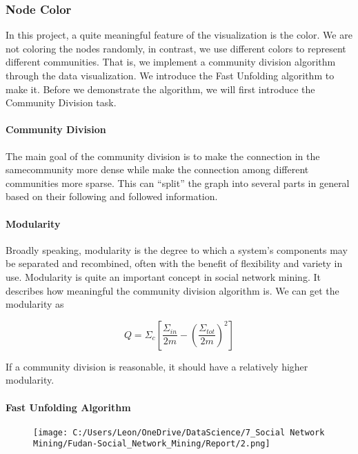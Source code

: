\documentclass[]{article}
\let\oldparagraph\paragraph
\renewcommand{\paragraph}[1]{\oldparagraph{#1}\mbox{}}
\begin{document}
\hypertarget{header-n16}{%
\subsubsection{Node Color}\label{header-n16}}

In this project, a quite meaningful feature of the visualization is the
color. We are not coloring the nodes randomly, in contrast, we use
different colors to represent different communities. That is, we
implement a community division algorithm through the data visualization.
We introduce the Fast Unfolding algorithm to make it. Before we
demonstrate the algorithm, we will first introduce the Community
Division task.

\hypertarget{header-n19}{%
\paragraph{Community Division}\label{header-n19}}

The main goal of the community division is to make the connection in the
samecommunity more dense while make the connection among different
communities more sparse. This can ``split'' the graph into several parts
in general based on their following and followed information.\\

\hypertarget{header-n22}{%
\paragraph{Modularity}\label{header-n22}}

Broadly speaking, modularity is the degree to which a system's
components may be separated and recombined, often with the benefit of
flexibility and variety in use. Modularity is quite an important concept
in social network mining. It describes how meaningful the community
division algorithm is. We can get the modularity as

\[Q =Σ_c  [ \frac{Σ_{in}}{2m}−(\frac{Σ_{tot}}{2m})^2]\]

If a community division is reasonable, it should have a relatively
higher modularity.

\hypertarget{header-n28}{%
\paragraph{Fast Unfolding Algorithm}\label{header-n28}}

\begin{figure}
\centering
\texttt{[image: C:/Users/Leon/OneDrive/DataScience/7\_Social Network Mining/Fudan-Social\_Network\_Mining/Report/2.png]}
\caption{}
\end{figure}
\end{document}
